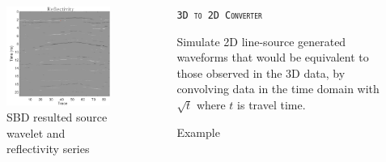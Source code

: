 \documentclass[final]{beamer}
\newlength{\sepwid}
\newlength{\onecolwid}
\newlength{\twocolwid}
\begin{document}
\begin{frame}[t]
\begin{columns}[t]
\begin{column}{\twocolwid}
\begin{columns}[t,totalwidth=\twocolwid]
\begin{column}{\onecolwid}
\begin{block}{}
\begin{figure}
	\includegraphics[width=0.7\linewidth]{SBD_pipe_refl.png}
	\caption{\textrm{SBD resulted source wavelet and reflectivity series~\cite{jazayeri2017sparse}}}
\end{figure}
\end{block}



\end{column} %

\end{columns} %

\end{column} %

\begin{column}{\sepwid}\end{column} %

\begin{column}{\onecolwid} %

\begin{block}{\textsc{\texttt{3D to 2D Converter}}}
	
	Simulate 2D line-source generated waveforms that would be equivalent to those observed in the 3D data, by convolving data in the time domain with $\sqrt{t}$ where $t$ is travel time.
	
\end{block}

\vspace{3cm}

\begin{block}{Example}
	

\end{block}
\end{column}
\end{columns}
\end{frame}
\end{document}

